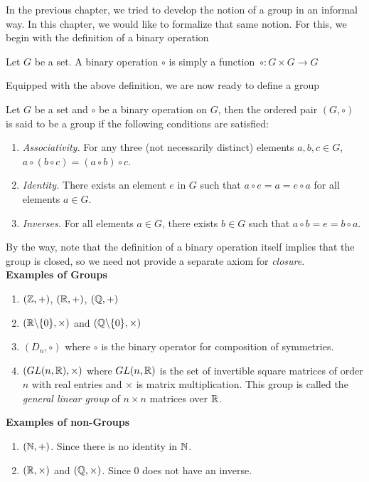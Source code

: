 In the previous chapter, we tried to develop the notion of a group in an informal way. In this chapter, we would like to formalize that same notion. For this, we begin with the definition of a binary operation
\begin{definition}
	Let $G$ be a set. A binary operation $\circ$ is simply a function~$\circ:G\times G\to G$ 
\end{definition}

Equipped with the above definition, we are now ready to define a group
\begin{definition}
	Let $G$ be a set and $\circ$ be a binary operation on $G$, then the ordered pair $(G,\circ)$ is said to be a group if the following conditions are satisfied:
	\begin{enumerate}
		\item\textit{Associativity.} For any three (not necessarily distinct) elements $a,b,c\in G$, $a\circ(b\circ c)=(a\circ b)\circ c$.
		\item\textit{Identity.} There exists an element $e$ in $G$ such that $a\circ e=a=e\circ a$ for all elements $a\in G$.
		\item\textit{Inverses.} For all elements $a\in G$, there exists $b\in G$ such that $a\circ b=e=b\circ a$.
	\end{enumerate}
\end{definition}

By the way, note that the definition of a binary operation itself implies that the group is closed, so we need not provide a separate axiom for \textit{closure}.\\

\textbf{Examples of Groups}
\begin{enumerate}
	\item $(\mathbb{Z},+)$, $(\mathbb{R},+)$, $(\mathbb{Q},+)$
	\item $(\mathbb{R}\backslash\{0\},\times)$ and $(\mathbb{Q}\backslash\{0\},\times)$
	\item $(D_n,\circ)$ where $\circ$ is the binary operator for composition of symmetries.
	\item $(GL(n,\mathbb{R}),\times)$ where $GL(n,\mathbb{R})$ is the set of invertible square matrices of order $n$ with real entries and $\times$ is matrix multiplication. This group is called the \textit{general linear group} of $n\times n$ matrices over $\mathbb{R}$.
\end{enumerate}

\textbf{Examples of non-Groups}
\begin{enumerate}
	\item $(\mathbb{N},+)$. Since there is no identity in $\mathbb{N}$.
	\item $(\mathbb{R},\times)$ and $(\mathbb{Q},\times)$. Since $0$ does not have an inverse.
\end{enumerate}


